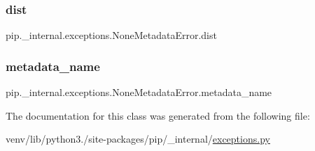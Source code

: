 \subsubsection{\texorpdfstring{dist}{dist}}
{\footnotesize\ttfamily pip.\+\_\+internal.\+exceptions.\+None\+Metadata\+Error.\+dist}

\mbox{\label{classpip_1_1__internal_1_1exceptions_1_1NoneMetadataError_a481999145818b3f67f84c05fde8ab1eb}} 
\subsubsection{\texorpdfstring{metadata\+\_\+name}{metadata\_name}}
{\footnotesize\ttfamily pip.\+\_\+internal.\+exceptions.\+None\+Metadata\+Error.\+metadata\+\_\+name}



The documentation for this class was generated from the following file\+:\begin{DoxyCompactItemize}
\item 
venv/lib/python3./site-\/packages/pip/\+\_\+internal/\hyperlink{pip_2__internal_2exceptions_8py}{exceptions.\+py}\end{DoxyCompactItemize}
